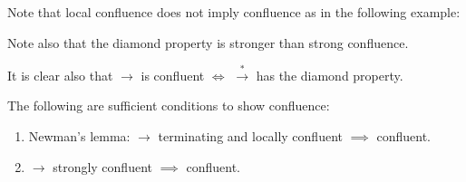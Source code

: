 Note that local confluence does not imply confluence as in the following example:


Note also that the diamond property is stronger than strong confluence. 

It is clear also that $\to$ is confluent $\iff$ $\stackrel{*}{\to}$ has the diamond property.

\begin{proposition}
The following are sufficient conditions to show confluence:

\begin{enumerate}
\item Newman's lemma: $\to$ terminating and locally confluent $\implies$ confluent.

\item $\to$ strongly confluent $\implies$ confluent.

\end{enumerate}
\end{proposition}
